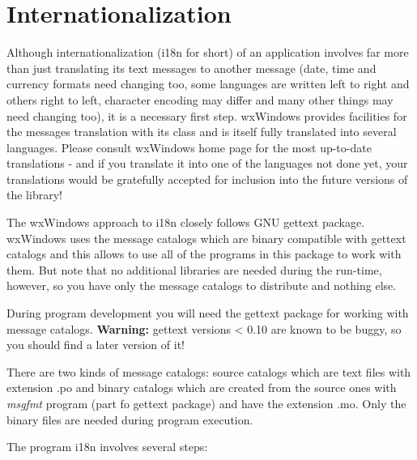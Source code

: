 \section{Internationalization}\label{internationalization}

Although internationalization (i18n for short) of an application involves far
more than just translating its text messages to another message (date, time and
currency formats need changing too, some languages are written left to right
and others right to left, character encoding may differ and many other things
may need changing too), it is a necessary first step. wxWindows provides
facilities for the messages translation with its 
 class and is itself fully translated into several
languages. Please consult wxWindows home page for the most up-to-date
translations - and if you translate it into one of the languages not done
yet, your translations would be gratefully accepted for inclusion into the
future versions of the library!

The wxWindows approach to i18n closely follows GNU gettext package. wxWindows uses the
message catalogs which are binary compatible with gettext catalogs and this
allows to use all of the programs in this package to work with them. But note
that no additional libraries are needed during the run-time, however, so you
have only the message catalogs to distribute and nothing else.

During program development you will need the gettext package for
working with message catalogs. {\bf Warning:} gettext versions < 0.10 are known
to be buggy, so you should find a later version of it!

There are two kinds of message catalogs: source catalogs which are text files
with extension .po and binary catalogs which are created from the source ones
with {\it msgfmt} program (part fo gettext package) and have the extension .mo.
Only the binary files are needed during program execution.

The program i18n involves several steps:

